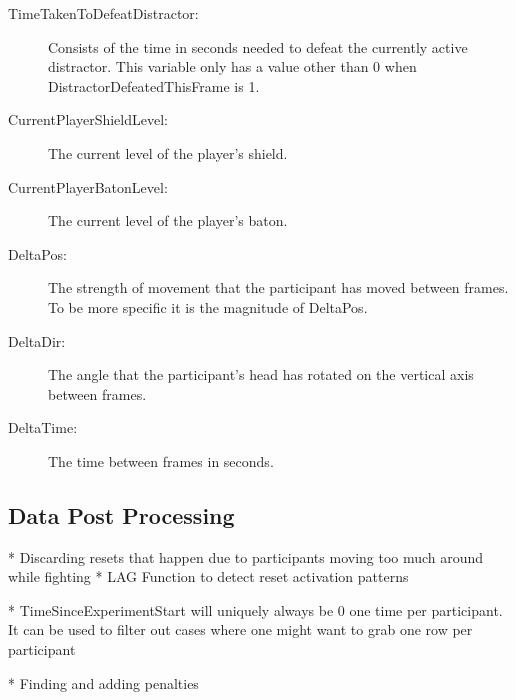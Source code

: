 \begin{description}
   \item[TimeTakenToDefeatDistractor:] Consists of the time in seconds needed to defeat the currently active distractor. This variable only has a value other than 0 when DistractorDefeatedThisFrame is 1. 
   \item[CurrentPlayerShieldLevel:] The current level of the player's shield. 
   \item[CurrentPlayerBatonLevel:] The current level of the player's baton. 
   \item[DeltaPos:] The strength of movement that the participant has moved between frames. To be more specific it is the magnitude of DeltaPos. 
   \item[DeltaDir:] The angle that the participant's head has rotated on the vertical axis between frames.
   \item[DeltaTime:] The time between frames in seconds.
\end{description}


\subsection{Data Post Processing}\label{sec:ex2postprocessingdetails}
  * Discarding resets that happen due to participants moving too much around while fighting
  * LAG Function to detect reset activation patterns
 
 * TimeSinceExperimentStart will uniquely always be 0 one time per participant. It can be used to filter out cases where one might want to grab one row per participant

* Finding and adding penalties